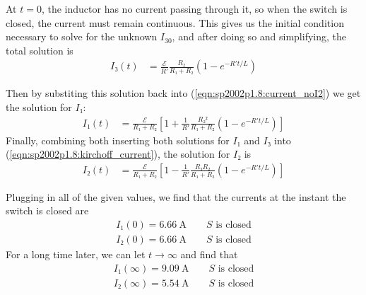 At $t = 0$, the inductor has no current passing through it, so when the switch
is closed, the current must remain continuous. This gives us the initial
condition necessary to solve for the unknown $I_{30}$, and after doing so
and simplifying, the total solution is
\begin{align}
    I₃(t) &= \frac{\mathcal E}{R'}\frac{R₂}{R₁+R₂}(1 - e^{-R't/L})
	\label{eqn:sp2002p1.8:I3_charging}
\end{align}

Then by substiting this solution back into (\ref{eqn:sp2002p1.8:current_noI2})
we get the solution for $I₁$:
\begin{align}
    I₁(t) &= \frac{\mathcal E}{R₁+R₂} \left[ 1 + \frac{1}{R'}
	\frac{{R₂}²}{R₁+R₂} (1 - e^{-R't/L}) \right]
	\label{eqn:sp2002p1.8:I1_charging}
\end{align}
Finally, combining both inserting both solutions for $I₁$ and $I₃$ into
(\ref{eqn:sp2002p1.8:kirchoff_current}), the solution for $I₂$ is
\begin{align}
    I₂(t) &= \frac{\mathcal E}{R₁+R₂} \left[ 1 - \frac{1}{R'}
	\frac{R₁R₂}{R₁+R₂} (1 - e^{-R't/L}) \right]
	\label{eqn:sp2002p1.8:I2_charging}
\end{align}

Plugging in all of the given values, we find that the currents at the instant
the switch is closed are
\begin{align}
    \boxed{I₁(0) = \SI{6.66}{\A}\quad\quad\text{$S$ is closed}} \\
    \boxed{I₂(0) = \SI{6.66}{\A}\quad\quad\text{$S$ is closed}}
\end{align}
For a long time later, we can let $t \rightarrow ∞$ and find that
\begin{align}
    \boxed{I₁(∞) = \SI{9.09}{\A}\quad\quad\text{$S$ is closed}} \\
    \boxed{I₂(∞) = \SI{5.54}{\A}\quad\quad\text{$S$ is closed}}
\end{align}

